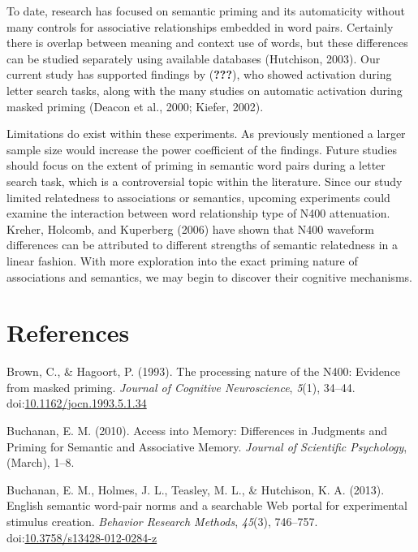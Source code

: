 \documentclass[english,man]{apa6}
\theoremstyle{definition}
\theoremstyle{definition}
\theoremstyle{definition}
\theoremstyle{remark}
\begin{document}
To date, research has focused on semantic priming and its automaticity
without many controls for associative relationships embedded in word
pairs. Certainly there is overlap between meaning and context use of
words, but these differences can be studied separately using available
databases (Hutchison, 2003). Our current study has supported findings by
({\textbf{???}}), who showed activation during letter search tasks,
along with the many studies on automatic activation during masked
priming (Deacon et al., 2000; Kiefer, 2002).

Limitations do exist within these experiments. As previously mentioned a
larger sample size would increase the power coefficient of the findings.
Future studies should focus on the extent of priming in semantic word
pairs during a letter search task, which is a controversial topic within
the literature. Since our study limited relatedness to associations or
semantics, upcoming experiments could examine the interaction between
word relationship type of N400 attenuation. Kreher, Holcomb, and
Kuperberg (2006) have shown that N400 waveform differences can be
attributed to different strengths of semantic relatedness in a linear
fashion. With more exploration into the exact priming nature of
associations and semantics, we may begin to discover their cognitive
mechanisms.

\newpage

\section{References}\label{references}

\setlength{\parindent}{-0.5in} \setlength{\leftskip}{0.5in}

\hypertarget{refs}{}
\hypertarget{ref-Brown1993}{}
Brown, C., \& Hagoort, P. (1993). The processing nature of the N400:
Evidence from masked priming. \emph{Journal of Cognitive Neuroscience},
\emph{5}(1), 34--44.
doi:\href{https://doi.org/10.1162/jocn.1993.5.1.34}{10.1162/jocn.1993.5.1.34}

\hypertarget{ref-Buchanan2010}{}
Buchanan, E. M. (2010). Access into Memory: Differences in Judgments and
Priming for Semantic and Associative Memory. \emph{Journal of Scientific
Psychology}, (March), 1--8.

\hypertarget{ref-Buchanan2013}{}
Buchanan, E. M., Holmes, J. L., Teasley, M. L., \& Hutchison, K. A.
(2013). English semantic word-pair norms and a searchable Web portal for
experimental stimulus creation. \emph{Behavior Research Methods},
\emph{45}(3), 746--757.
doi:\href{https://doi.org/10.3758/s13428-012-0284-z}{10.3758/s13428-012-0284-z}
\end{document}
